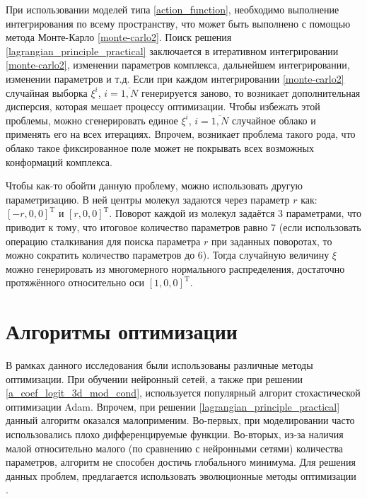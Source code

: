 При использовании моделей типа \ref{action_function}, необходимо выполнение интегрирования по всему пространству, что может быть выполнено с помощью метода Монте-Карло \ref{monte-carlo2}. Поиск решения \ref{lagrangian_principle_practical} заключается в итеративном интегрировании \ref{monte-carlo2}, изменении параметров комплекса, дальнейшем интегрировании, изменении параметров и т.д. Если при каждом интегрировании \ref{monte-carlo2} случайная выборка $\xi^i$, $i=\overline{1,N}$ генерируется заново, то возникает дополнительная дисперсия, которая мешает процессу оптимизации. Чтобы избежать этой проблемы, можно сгенерировать единое $\xi^i$, $i=\overline{1,N}$ случайное облако и применять его на всех итерациях. Впрочем, возникает проблема такого рода, что облако такое фиксированное поле может не покрывать всех возможных конформаций комплекса.

Чтобы как-то обойти данную проблему, можно использовать другую параметризацию. В ней центры молекул задаются через параметр $r$ как: $[-r, 0, 0]^\mathrm{T}$ и $[r, 0, 0]^\mathrm{T}$. Поворот каждой из молекул задаётся 3 параметрами, что приводит к тому, что итоговое количество параметров равно 7 (если использовать операцию сталкивания для поиска параметра $r$ при заданных поворотах, то можно сократить количество параметров до 6). Тогда случайную величину $\xi$ можно генерировать из многомерного нормального распределения, достаточно протяжённого относительно оси $[1, 0, 0]^\mathrm{T}$.

\section{Алгоритмы оптимизации}
В рамках данного исследования были использованы различные методы оптимизации. При обучении нейронный сетей, а также при решении \ref{a_coef_logit_3d_mod_cond}, используется популярный алгорит стохастической оптимизации Adam\cite{adam}. Впрочем, при решении \ref{lagrangian_principle_practical} данный алгоритм оказался малоприменим. Во-первых, при моделировании часто использовались плохо дифференцируемые функции. Во-вторых, из-за наличия малой относительно малого (по сравнению с нейронными сетями) количества параметров, алгоритм не способен достичь глобального минимума. Для решения данных проблем, предлагается использовать эволюционные методы оптимизации \cite{evol_methods}.

